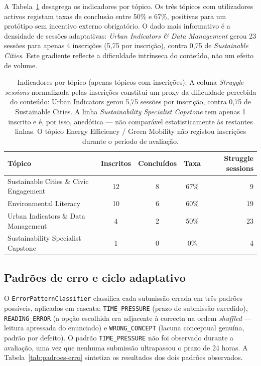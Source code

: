 A Tabela~\ref{tab:topicos-utilizacao} desagrega os indicadores por tópico. Os três tópicos com utilizadores activos registam taxas de conclusão entre 50\% e 67\%, positivas para um protótipo sem incentivo externo obrigatório. O dado mais informativo é a densidade de sessões adaptativas: \emph{Urban Indicators \& Data Management} gerou 23 sessões para apenas 4 inscrições (5,75 por inscrição), contra 0,75 de \emph{Sustainable Cities}. Este gradiente reflecte a dificuldade intrínseca do conteúdo, não um efeito de volume.

\begin{table}[htbp]
	\centering
	\small
	\begin{tabular}{p{5.5cm} c c c r}
		\toprule
		\textbf{Tópico} & \textbf{Inscritos} & \textbf{Concluídos} & \textbf{Taxa} & \textbf{Struggle sessions} \\
		\midrule
		Sustainable Cities \& Civic Engagement    & 12 & 8 & 67\% &  9 \\
		Environmental Literacy                    & 10 & 6 & 60\% & 19 \\
		Urban Indicators \& Data Management       &  4 & 2 & 50\% & 23 \\
		Sustainability Specialist Capstone        &  1 & 0 &  0\% &  4 \\
		\bottomrule
	\end{tabular}
	\caption[Indicadores de utilização e densidade de sessões adaptativas por tópico]{Indicadores por tópico (apenas tópicos com inscrições). A coluna \emph{Struggle sessions} normalizada pelas inscrições constitui um proxy da dificuldade percebida do conteúdo: Urban Indicators gerou 5,75 sessões por inscrição, contra 0,75 de Sustainable Cities. A linha \emph{Sustainability Specialist Capstone} tem apenas 1 inscrito e é, por isso, anedótica --- não comparável estatisticamente às restantes linhas. O tópico Energy Efficiency / Green Mobility não registou inscrições durante o período de avaliação.}
	\label{tab:topicos-utilizacao}
\end{table}

\subsection{Padrões de erro e ciclo adaptativo}
\label{ssec:padroes-erro}

O \texttt{ErrorPatternClassifier} classifica cada submissão errada em três padrões possíveis, aplicados em cascata: \texttt{TIME\_PRESSURE} (prazo de submissão excedido), \texttt{READING\_ERROR} (a opção escolhida era adjacente à correcta na ordem \emph{shuffled} --- leitura apressada do enunciado) e \texttt{WRONG\_CONCEPT} (lacuna conceptual genuína, padrão por defeito). O padrão \texttt{TIME\_PRESSURE} não foi observado durante a avaliação, uma vez que nenhuma submissão ultrapassou o prazo de 24 horas. A Tabela~\ref{tab:padroes-erro} sintetiza os resultados dos dois padrões observados.

